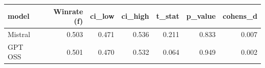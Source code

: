 \begin{tabular}{lrrrrrr}
\toprule
model & Winrate (f) & ci\_low & ci\_high & t\_stat & p\_value & cohens\_d \\
\midrule
Mistral & 0.503 & 0.471 & 0.536 & 0.211 & 0.833 & 0.007 \\
GPT OSS & 0.501 & 0.470 & 0.532 & 0.064 & 0.949 & 0.002 \\
\bottomrule
\end{tabular}
